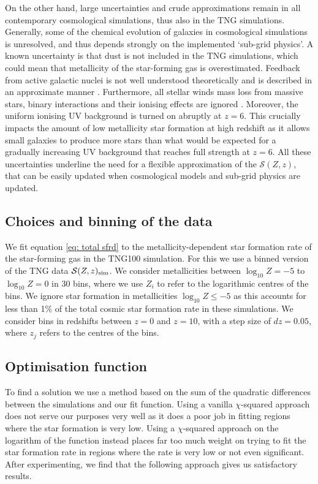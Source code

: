 \documentclass[linenumbers,twocolumn]{aastex631}
\newcommand{\SFRDzZ}{\ensuremath{\mathcal{S}(Z,z)}\xspace}
\begin{document}
On the other hand, large uncertainties and crude approximations remain in all contemporary cosmological simulations, thus also in the TNG simulations. 
Generally, some of the chemical evolution of galaxies in cosmological simulations is unresolved, and thus depends strongly on the implemented `sub-grid physics'.
A known uncertainty is that dust is not included in the TNG simulations, which could mean that metallicity of the star-forming gas is overestimated. 
Feedback from active galactic nuclei is not well understood theoretically and is described in an approximate manner \citep{Springel2005, Weinberger2017}.  Furthermore, all stellar winds mass loss from massive stars, binary interactions and their ionising effects are ignored \citep[e.g.][]{Dray+2003,Smith2014,Gotberg+2020,DoughtyFinlator2021,Farmer2021_carbonfootprint,Goswami+2022}.
Moreover, the uniform ionising UV background is turned on abruptly at $z=6$. This crucially impacts the amount of low metallicity star formation at high redshift as it allows small galaxies to produce more stars than what would be expected for a gradually increasing UV background that reaches full strength at $z=6$.
%
All these uncertainties underline the need for a flexible approximation of the \SFRDzZ, that can be easily updated when cosmological models and sub-grid physics are updated. 




\subsection{Choices and binning of the data}
We fit equation \ref{eq: total sfrd} to the metallicity-dependent star formation rate of the star-forming gas in the TNG100 simulation. For this we use a binned version of the TNG data $\SFRDzZ_{\rm sim}$. We consider metallicities between $\log_{10} Z= -5$ to $\log_{10} Z= 0$ in 30 bins, where we use $Z_i$ to refer to the logarithmic centres of the bins. We ignore star formation in metallicities $\log_{10} Z \le -5$ as this accounts for less than 1\% of the total cosmic star formation rate in these simulations.
We consider bins in redshifts between $z=0$ and $z=10$, with a step size of $dz=0.05$, where $z_j$ refers to the centres of the bins. 

\subsection{Optimisation function}
To find a solution we use a method based on the sum of the quadratic differences between the simulations and our fit function. Using a vanilla $\chi$-squared approach does not serve our purposes very well as it does a poor job in fitting regions where the star formation is very low.  Using a $\chi$-squared approach on the logarithm of the function instead places far too much weight on trying to fit the star formation rate in regions where the rate is very low or not even significant.  After experimenting, we find that the following approach gives us satisfactory results. 
\end{document}
